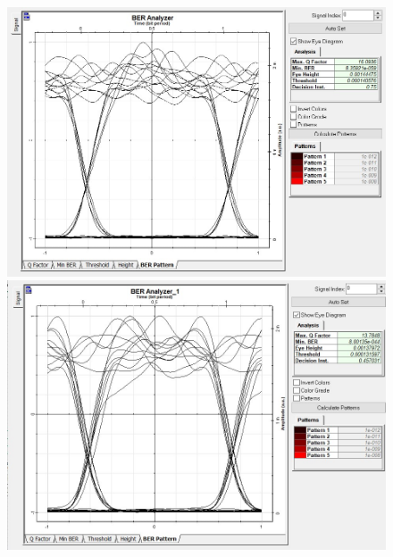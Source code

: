 \documentclass[12pt]{article}
\begin{document}
\begin{figure}[H]
    \begin{minipage}[t]{0.5\linewidth}
        \centering
        \includegraphics[scale=0.3]{1-BER.jpg}
        \caption{}
        \label{fig:side:a}
      \end{minipage}%
      \begin{minipage}[t]{0.5\linewidth}
        \centering
        \includegraphics[scale=0.3]{2-BER.jpg}
        \caption{}
        \label{fig:side:b}
      \end{minipage}
	  \begin{minipage}[t]{0.5\linewidth}
        \centering

\end{minipage}
\end{figure}
\end{document}
